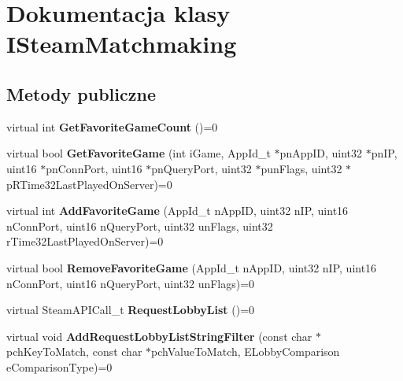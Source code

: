 \hypertarget{class_i_steam_matchmaking}{}\section{Dokumentacja klasy I\+Steam\+Matchmaking}
\label{class_i_steam_matchmaking}
\subsection*{Metody publiczne}
\begin{DoxyCompactItemize}
\item 
\mbox{\label{class_i_steam_matchmaking_a6be9442319d642a4d73270b81db845f8}} 
virtual int {\bfseries Get\+Favorite\+Game\+Count} ()=0
\item 
\mbox{\label{class_i_steam_matchmaking_a81aa9e83108de1baa3944f24a470e96e}} 
virtual bool {\bfseries Get\+Favorite\+Game} (int i\+Game, App\+Id\+\_\+t $\ast$pn\+App\+ID, uint32 $\ast$pn\+IP, uint16 $\ast$pn\+Conn\+Port, uint16 $\ast$pn\+Query\+Port, uint32 $\ast$pun\+Flags, uint32 $\ast$p\+R\+Time32\+Last\+Played\+On\+Server)=0
\item 
\mbox{\label{class_i_steam_matchmaking_aedae56e457b44270b6bc3a1e8558fee7}} 
virtual int {\bfseries Add\+Favorite\+Game} (App\+Id\+\_\+t n\+App\+ID, uint32 n\+IP, uint16 n\+Conn\+Port, uint16 n\+Query\+Port, uint32 un\+Flags, uint32 r\+Time32\+Last\+Played\+On\+Server)=0
\item 
\mbox{\label{class_i_steam_matchmaking_a598b028a11268947068416171fec6181}} 
virtual bool {\bfseries Remove\+Favorite\+Game} (App\+Id\+\_\+t n\+App\+ID, uint32 n\+IP, uint16 n\+Conn\+Port, uint16 n\+Query\+Port, uint32 un\+Flags)=0
\item 
\mbox{\label{class_i_steam_matchmaking_ab11d5a805d6b00605fa60f28d1a6de4b}} 
virtual Steam\+A\+P\+I\+Call\+\_\+t {\bfseries Request\+Lobby\+List} ()=0
\item 
\mbox{\label{class_i_steam_matchmaking_aa001d585efefb54852f5569726232947}} 
virtual void {\bfseries Add\+Request\+Lobby\+List\+String\+Filter} (const char $\ast$pch\+Key\+To\+Match, const char $\ast$pch\+Value\+To\+Match, E\+Lobby\+Comparison e\+Comparison\+Type)=0

\end{DoxyCompactItemize}
